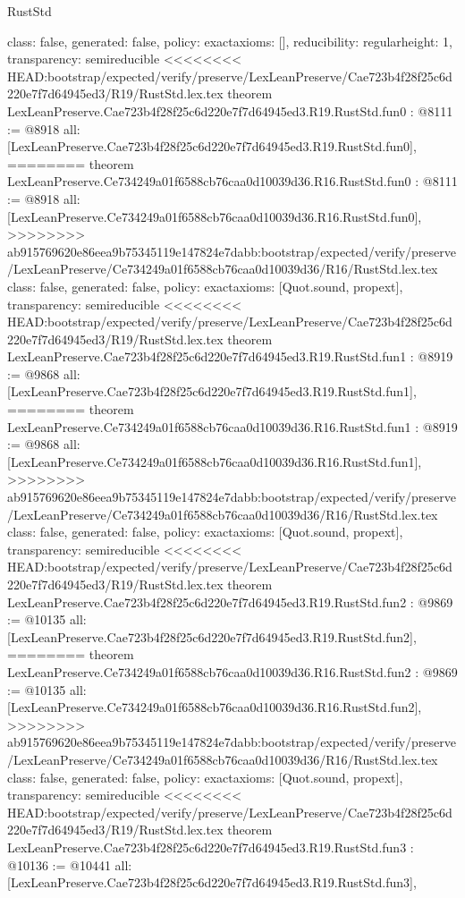 \begin{lexlean}{RustStd}
\begin{coremodule}
{\begin{coremodule}
{{{  class: false,
  generated: false,
  policy: exact{axioms: []},
  reducibility: regular{height: 1},
  transparency: semireducible
}
<<<<<<<< HEAD:bootstrap/expected/verify/preserve/LexLeanPreserve/Cae723b4f28f25c6d220e7f7d64945ed3/R19/RustStd.lex.tex
theorem LexLeanPreserve.Cae723b4f28f25c6d220e7f7d64945ed3.R19.RustStd.fun0 : @8111 := @8918 {
  all: [LexLeanPreserve.Cae723b4f28f25c6d220e7f7d64945ed3.R19.RustStd.fun0],
========
theorem LexLeanPreserve.Ce734249a01f6588cb76caa0d10039d36.R16.RustStd.fun0 : @8111 := @8918 {
  all: [LexLeanPreserve.Ce734249a01f6588cb76caa0d10039d36.R16.RustStd.fun0],
>>>>>>>> ab915769620e86eea9b75345119e147824e7dabb:bootstrap/expected/verify/preserve/LexLeanPreserve/Ce734249a01f6588cb76caa0d10039d36/R16/RustStd.lex.tex
  class: false,
  generated: false,
  policy: exact{axioms: [Quot.sound, propext]},
  transparency: semireducible
}
<<<<<<<< HEAD:bootstrap/expected/verify/preserve/LexLeanPreserve/Cae723b4f28f25c6d220e7f7d64945ed3/R19/RustStd.lex.tex
theorem LexLeanPreserve.Cae723b4f28f25c6d220e7f7d64945ed3.R19.RustStd.fun1 : @8919 := @9868 {
  all: [LexLeanPreserve.Cae723b4f28f25c6d220e7f7d64945ed3.R19.RustStd.fun1],
========
theorem LexLeanPreserve.Ce734249a01f6588cb76caa0d10039d36.R16.RustStd.fun1 : @8919 := @9868 {
  all: [LexLeanPreserve.Ce734249a01f6588cb76caa0d10039d36.R16.RustStd.fun1],
>>>>>>>> ab915769620e86eea9b75345119e147824e7dabb:bootstrap/expected/verify/preserve/LexLeanPreserve/Ce734249a01f6588cb76caa0d10039d36/R16/RustStd.lex.tex
  class: false,
  generated: false,
  policy: exact{axioms: [Quot.sound, propext]},
  transparency: semireducible
}
<<<<<<<< HEAD:bootstrap/expected/verify/preserve/LexLeanPreserve/Cae723b4f28f25c6d220e7f7d64945ed3/R19/RustStd.lex.tex
theorem LexLeanPreserve.Cae723b4f28f25c6d220e7f7d64945ed3.R19.RustStd.fun2 : @9869 := @10135 {
  all: [LexLeanPreserve.Cae723b4f28f25c6d220e7f7d64945ed3.R19.RustStd.fun2],
========
theorem LexLeanPreserve.Ce734249a01f6588cb76caa0d10039d36.R16.RustStd.fun2 : @9869 := @10135 {
  all: [LexLeanPreserve.Ce734249a01f6588cb76caa0d10039d36.R16.RustStd.fun2],
>>>>>>>> ab915769620e86eea9b75345119e147824e7dabb:bootstrap/expected/verify/preserve/LexLeanPreserve/Ce734249a01f6588cb76caa0d10039d36/R16/RustStd.lex.tex
  class: false,
  generated: false,
  policy: exact{axioms: [Quot.sound, propext]},
  transparency: semireducible
}
<<<<<<<< HEAD:bootstrap/expected/verify/preserve/LexLeanPreserve/Cae723b4f28f25c6d220e7f7d64945ed3/R19/RustStd.lex.tex
theorem LexLeanPreserve.Cae723b4f28f25c6d220e7f7d64945ed3.R19.RustStd.fun3 : @10136 := @10441 {
  all: [LexLeanPreserve.Cae723b4f28f25c6d220e7f7d64945ed3.R19.RustStd.fun3],
}}}}}}
\end{coremodule}}
\end{coremodule}
\end{lexlean}
